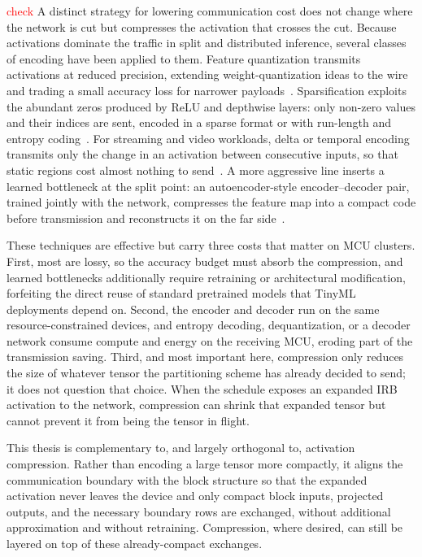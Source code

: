 \textcolor{red}{check} A distinct strategy for lowering communication cost does not change where the network is cut but compresses the activation that crosses the cut. 
Because activations dominate the traffic in split and distributed inference, several classes of encoding have been applied to them. Feature quantization transmits activations at reduced precision, extending weight-quantization ideas to the wire and trading a small accuracy loss for narrower payloads~\cite{}. 
Sparsification exploits the abundant zeros produced by ReLU and depthwise layers: only non-zero values and their indices are sent, encoded in a sparse format or with run-length and entropy coding~\cite{}. 
For streaming and video workloads, delta or temporal encoding transmits only the change in an activation between consecutive inputs, so that static regions cost almost nothing to send~\cite{}. A more aggressive line inserts a learned bottleneck at the split point: an autoencoder-style encoder--decoder pair, trained jointly with the network, compresses the feature map into a compact code before transmission and reconstructs it on the far side~\cite{bottlenet,bottlenetpp}.

These techniques are effective but carry three costs that matter on MCU clusters. First, most are lossy, so the accuracy budget must absorb the compression, and learned bottlenecks additionally require retraining or architectural modification, forfeiting the direct reuse of standard pretrained models that TinyML deployments depend on. Second, the encoder and decoder run on the same resource-constrained devices, and entropy decoding, dequantization, or a decoder network consume compute and energy on the receiving MCU, eroding part of the transmission saving. Third, and most important here, compression only reduces the size of whatever tensor the partitioning scheme has already decided to send; it does not question that choice. When the schedule exposes an expanded IRB activation to the network, compression can shrink that expanded tensor but cannot prevent it from being the tensor in flight.

This thesis is complementary to, and largely orthogonal to, activation compression. 
Rather than encoding a large tensor more compactly, it aligns the communication boundary with the block structure so that the expanded activation never leaves the device and only compact block inputs, projected outputs, and the necessary boundary rows are exchanged, without additional approximation and without retraining. Compression, where desired, can still be layered on top of these already-compact exchanges.


